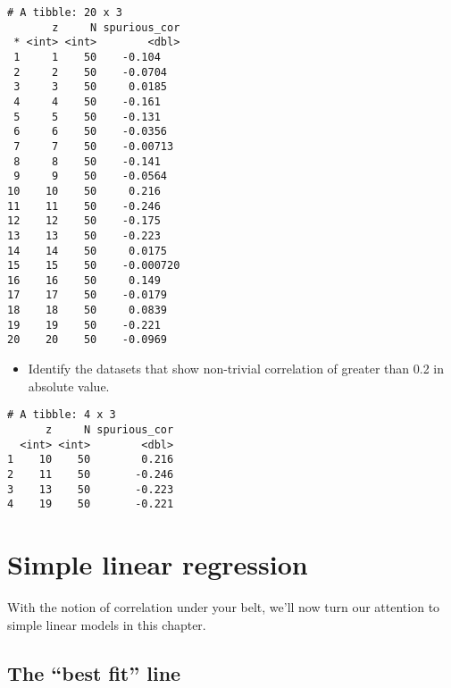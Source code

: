 \documentclass[
]{book}
\newenvironment{Shaded}{\begin{snugshade}}{\end{snugshade}}
\newcommand{\CommentTok}[1]{\textcolor[rgb]{0.56,0.35,0.01}{\textit{#1}}}
\newcommand{\FloatTok}[1]{\textcolor[rgb]{0.00,0.00,0.81}{#1}}
\newcommand{\KeywordTok}[1]{\textcolor[rgb]{0.13,0.29,0.53}{\textbf{#1}}}
\newcommand{\NormalTok}[1]{#1}
\newcommand{\OperatorTok}[1]{\textcolor[rgb]{0.81,0.36,0.00}{\textbf{#1}}}
\newcommand{\StringTok}[1]{\textcolor[rgb]{0.31,0.60,0.02}{#1}}
\providecommand{\tightlist}{%
  \setlength{\itemsep}{0pt}\setlength{\parskip}{0pt}}
\begin{document}
\begin{verbatim}
# A tibble: 20 x 3
       z     N spurious_cor
 * <int> <int>        <dbl>
 1     1    50    -0.104   
 2     2    50    -0.0704  
 3     3    50     0.0185  
 4     4    50    -0.161   
 5     5    50    -0.131   
 6     6    50    -0.0356  
 7     7    50    -0.00713 
 8     8    50    -0.141   
 9     9    50    -0.0564  
10    10    50     0.216   
11    11    50    -0.246   
12    12    50    -0.175   
13    13    50    -0.223   
14    14    50     0.0175  
15    15    50    -0.000720
16    16    50     0.149   
17    17    50    -0.0179  
18    18    50     0.0839  
19    19    50    -0.221   
20    20    50    -0.0969  
\end{verbatim}

\begin{itemize}
\tightlist
\item
  Identify the datasets that show non-trivial correlation of greater than 0.2 in absolute value.
\end{itemize}

\begin{Shaded}
\end{Shaded}

\begin{verbatim}
# A tibble: 4 x 3
      z     N spurious_cor
  <int> <int>        <dbl>
1    10    50        0.216
2    11    50       -0.246
3    13    50       -0.223
4    19    50       -0.221
\end{verbatim}

\hypertarget{simple-linear-regression}{%
\chapter{Simple linear regression}\label{simple-linear-regression}}

With the notion of correlation under your belt, we'll now turn our attention to simple linear models in this chapter.

\hypertarget{the-best-fit-line}{%
\section{The ``best fit'' line}\label{the-best-fit-line}}
\end{document}
